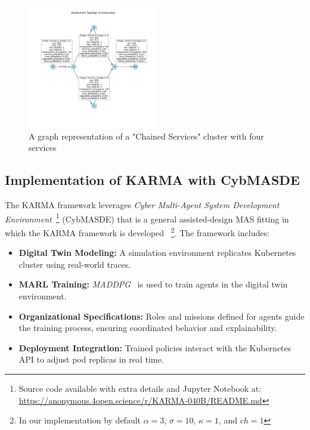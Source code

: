\documentclass[conference]{IEEEtran}
\begin{document}
\begin{figure}[h!]
    \centering
    \hspace{-0.4cm}
    \includegraphics[trim=1.8cm 3.3cm 1.25cm 3.5cm, clip, width=0.5\textwidth]{figures/k8s_cluster_graph.pdf}
    \caption{A graph representation of a "Chained Services" cluster with four services}
    \label{fig:chained_services_graph}
\end{figure}

\subsection{Implementation of KARMA with CybMASDE}


The KARMA framework leverages \textit{Cyber Multi-Agent System Development Environment}~\footnote{Source code available with extra details and Jupyter Notebook at: \url{https://anonymous.4open.science/r/KARMA-040B/README.md}} (CybMASDE) that is a general assisted-design MAS fitting in which the KARMA framework is developed
~\footnote{In our implementation by default $\alpha = 3$, $\sigma = 10$, $\kappa = 1$, and $ch = 1$}.
The framework includes:
\begin{itemize}
    \item \textbf{Digital Twin Modeling:} A simulation environment replicates Kubernetes cluster using real-world traces.
    \item \textbf{MARL Training:} \textit{MADDPG}~\cite{lowe2017multi} is used to train agents in the digital twin environment.
    \item \textbf{Organizational Specifications:} Roles and missions defined for agents guide the training process, ensuring coordinated behavior and explainability.
    \item \textbf{Deployment Integration:} Trained policies interact with the Kubernetes API to adjust pod replicas in real time.
\end{itemize}
\end{document}
